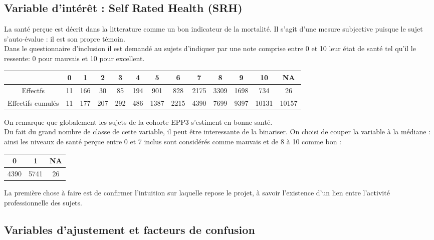\documentclass{book}
\begin{document}
\subsection{Variable d'intérêt : Self Rated Health (SRH)}
\noindent
La santé perçue est décrit dans la litterature comme un bon indicateur de la mortalité. Il s'agit d'une mesure subjective puisque le sujet s'auto-évalue : il est son propre témoin.\\
Dans le questionnaire d'inclusion il est demandé au sujets d'indiquer par une note comprise entre 0 et 10 leur état de santé tel qu'il le ressente: 0 pour mauvais et 10 pour excellent.\\

\begin{center}
\setlength\arrayrulewidth{.6pt}
\begin{tabular}{|c||c|c|c|c|c|c|c|c|c|c|c|c|}
\hline
 & 0 & 1 & 2 & 3 & 4 & 5 & 6 & 7 & 8 & 9 & 10 & NA\\
 \hline
 \hline
Effectfs & 11 & 166 &  30  & 85 & 194 & 901 & 828 & 2175 & 3309 & 1698 &  734 &  26\\ 
\hline
Effectifs cumulés & 11 &  177  & 207 &  292 &  486 & 1387 & 2215 & 4390&  7699 & 9397 &10131 &10157\\ 
\hline
\end{tabular}
\end{center}

\noindent
On remarque que globalement les sujets de la cohorte EPP3 s'estiment en bonne santé.\\
Du fait du grand nombre de classe de cette variable, il peut être interessante de la binariser. On choisi de couper la variable à la médiane : ainsi les niveaux de santé perçue entre 0 et 7 inclus sont considérés comme mauvais et de 8 à 10 comme bon : \\
\begin{center}
\setlength\arrayrulewidth{.6pt}
\begin{tabular}{|c|c|c|}
\hline
  0  &  1& NA \\
  \hline
  \hline 
4390& 5741&   26\\
\hline 
\end{tabular}
\end{center}

\noindent
La première chose à faire est de confirmer l'intuition sur laquelle repose le projet, à savoir l'existence d'un lien entre l'activité professionnelle des sujets. 

\subsection{Variables d'ajustement et facteurs de confusion}
\end{document}
